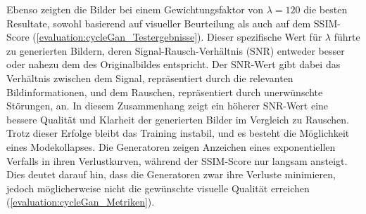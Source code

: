 Ebenso zeigten die Bilder bei einem Gewichtungsfaktor von $\lambda = 120$ die besten Resultate, sowohl basierend auf visueller Beurteilung als auch auf dem SSIM-Score (\ref{evaluation:cycleGan_Testergebnisse}). Dieser spezifische Wert für $\lambda$ führte zu generierten Bildern, deren Signal-Rausch-Verhältnis (SNR) entweder besser oder nahezu dem des Originalbildes entspricht. Der SNR-Wert gibt dabei das Verhältnis zwischen dem Signal, repräsentiert durch die relevanten Bildinformationen, und dem Rauschen, repräsentiert durch unerwünschte Störungen, an. In diesem Zusammenhang zeigt ein höherer SNR-Wert eine bessere Qualität und Klarheit der generierten Bilder im Vergleich zu Rauschen.
\\\newline
Trotz dieser Erfolge bleibt das Training instabil, und es besteht die Möglichkeit eines Modekollapses. Die Generatoren zeigen Anzeichen eines exponentiellen Verfalls in ihren Verlustkurven, während der SSIM-Score nur langsam ansteigt. Dies deutet darauf hin, dass die Generatoren zwar ihre Verluste minimieren, jedoch möglicherweise nicht die gewünschte visuelle Qualität erreichen (\ref{evaluation:cycleGan_Metriken}).

